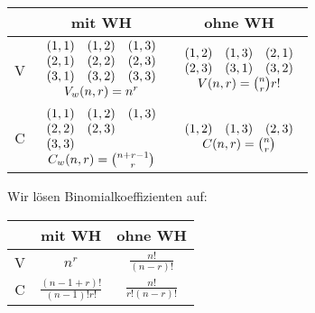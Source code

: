 \documentclass[a4paper,twocolumn]{article}
\begin{document}
\begin{tabular}{c|c|c}
                &       mit WH        &      ohne WH      \\
    \hline
    V           & $\begin{array}{ccc}
                  (1,1) & (1,2) & (1,3) \\
                  (2,1) & (2,2) & (2,3) \\
                  (3,1) & (3,2) & (3,3) \\
                  \multicolumn{3}{c}{V_w(n,r) = n^r} \\
                  \end{array}$
                                      & $\begin{array}{ccc}
                                        (1,2) & (1,3) & (2,1) \\
                                        (2,3) & (3,1) & (3,2) \\
                                        \multicolumn{3}{c}{
                                            V(n,r) = {n \choose r} r!
                                        } \\ \end{array}$ \\
    \hline
    C           & $\begin{array}{ccc}
                  (1,1) & (1,2) & (1,3) \\
                  (2,2) & (2,3) & \\
                  (3,3) &       & \\
                  \multicolumn{3}{c}{C_w(n,r) = {n+r-1 \choose r}} \\
                  \end{array}$
                                      & $\begin{array}{ccc}
                                        (1,2) & (1,3) & (2,3) \\
                                        \multicolumn{3}{c}{C(n,r)
                                            = {n \choose r}}
                                        \end{array}$ \\
\end{tabular}

\vspace{10pt}
Wir lösen Binomialkoeffizienten auf:

\begin{center}
\begin{tabular}{c|c|c}
                &       mit WH        &      ohne WH      \\
    \hline
    V           & $ n^r $             & $\frac{n!}{(n-r)!} $ \\
    \hline
    C           & $\frac{(n - 1 + r)!}{(n-1)! r!}$
                                      & $\frac{n!}{r! (n - r)!}$ \\
\end{tabular}
\end{center}
\vspace{10pt}
\end{document}
